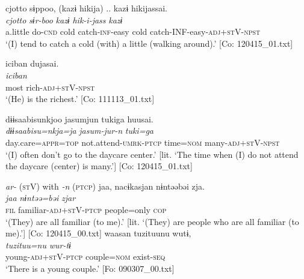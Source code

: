 \ex \label{ex:9.46c} %
    \glll  {\textbar}cjotto{\textbar}  sɨppoo,  (kazɨ  hikija)  ..  kazɨ  hikijassai.\\
      \textit{cjotto}  \textit{sɨr-boo}  \textit{kazɨ}  \textit{hik-i-jass}    \textit{kazɨ} \textit{}\\
      a.little  do-\textsc{cnd}  cold  catch-\textsc{inf}-easy    cold  catch-INF-easy-\textsc{adj}+\textsc{st}V-\textsc{npst}\\
      \glt       ‘(I) tend to catch a cold (with) a little (walking around).’ [Co: 120415\_01.txt]

\ex \label{ex:9.46d} %
 \glll  {\textbar}iciban{\textbar}  dujasai.\\
      \textit{iciban}  \textit{}\\
      most  rich-\textsc{adj}+\textsc{st}V-\textsc{npst}\\
      \glt       ‘(He) is the richest.’ [Co: 111113\_01.txt]

\ex \label{ex:9.46e} %
\glll {\textbar}dɨɨsaabisu{\textbar}nkjoo  jasumjun  tukiga  huusai.\\
      \textit{dɨɨsaabisu=nkja=ja}  \textit{jasum-jur-n}  \textit{tuki=ga}  \textit{}\\
      day.care=\textsc{appr}=\textsc{top}  not.attend-\textsc{umrk}-\textsc{ptcp}  time=\textsc{nom}   many-\textsc{adj}+\textsc{st}V-\textsc{npst}\\
      \glt ‘(I) often don’t go to the daycare center.’ [lit. ‘The time when (I) do not attend the daycare (center) is many.’]    [Co: 120415\_01.txt]

\exi{} \textit{ar-} (\textsc{st}V) with \textit{{}-n} (\textsc{ptcp})
\ex\label{ex:9.46f} %
  \glll  jaa,  nacɨkasjan  nɨntəəbəi  zja.\\
      \textit{jaa}  \textit{}  \textit{nɨntəə=bəi}  \textit{zjar}\\
      \textsc{fil}  familiar-\textsc{adj}+\textsc{st}V-\textsc{ptcp}  people=only  \textsc{cop}\\
      \glt       ‘(They) are all familiar (to me).’ [lit. ‘(They) are people who are all familiar (to me).’] [Co: 120415\_00.txt]
\ex\label{ex:9.46g}%
\glll  waasan  tuzituunu  wutɨ,\\
      \textit{}  \textit{tuzituu=nu}  \textit{wur-tɨ}\\
      young-\textsc{adj}+\textsc{st}V-\textsc{ptcp}  couple=\textsc{nom}  exist-\textsc{seq}\\
      \glt       ‘There is a young couple.’ [Fo: 090307\_00.txt]

